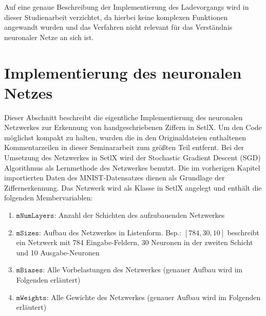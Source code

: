 \noindent
Auf eine genaue Beschreibung der Implementierung des Ladevorgangs wird in dieser Studienarbeit verzichtet, da hierbei keine komplexen Funktionen angewandt wurden und das Verfahren nicht relevant für das Verständnis neuronaler Netze an sich ist.

\section{Implementierung des neuronalen Netzes}
Dieser Abschnitt beschreibt die eigentliche Implementierung des neuronalen Netzwerkes zur Erkennung von handgeschriebenen Ziffern in SetlX. Um den Code möglichst kompakt zu halten, wurden die in den Originaldateien enthaltenen Kommentarzeilen in dieser Seminararbeit zum größten Teil entfernt.
Bei der Umsetzung des Netzwerkes in SetlX wird der Stochastic Gradient Descent (SGD) Algorithmus als Lernmethode des Netzwerkes benutzt. Die im vorherigen Kapitel importierten Daten des MNIST-Datensatzes dienen als Grundlage der Ziffernerkennung. 
Das Netzwerk wird als Klasse in SetlX angelegt und enthält die folgenden Membervariablen:

\begin{enumerate}
\item $\mathtt{mNumLayers}$: Anzahl der Schichten des aufzubauenden Netzwerkes 
\item $\mathtt{mSizes}$: Aufbau des Netzwerkes in Listenform. Bsp.: $[784, 30, 10]$ beschreibt ein Netzwerk mit 784 Eingabe-Feldern, 30 Neuronen in der zweiten Schicht und 10 Ausgabe-Neuronen
\item $\mathtt{mBiases}$: Alle Vorbelastungen des Netzwerkes (genauer Aufbau wird im Folgenden erläutert)
\item $\mathtt{mWeights}$: Alle Gewichte des Netzwerkes (genauer Aufbau wird im Folgenden erläutert)
\end{enumerate}

